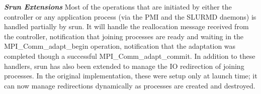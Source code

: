 \textbf{\textit{Srun Extensions}} Most of the operations that are initiated by either the controller or any application process (via the PMI and the SLURMD daemons) is handled partially by srun. It will handle the reallocation message received from the controller, notification that joining processes are ready and waiting in the MPI{\_}Comm{\_}adapt{\_}begin operation, notification that the adaptation was completed though a successful MPI{\_}Comm{\_}adapt{\_}commit. In addition to these handlers, srun has also been extended to manage the IO redirection of joining processes. In the original implementation, these were setup only at launch time; it can now manage redirections dynamically as processes are created and destroyed.
